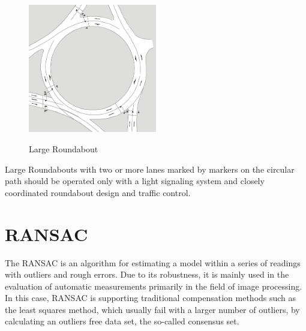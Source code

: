 \begin{figure}[!ht]
\caption{Large Roundabout \cite{man06}}
\includegraphics[width=0.5\textwidth]{bilder/large_roundabout.png} %
\label{roundabout_large}
\end{figure}

Large Roundabouts with two or more lanes marked by markers on the circular path should be operated only with a light signaling system and closely coordinated roundabout design and traffic control.\cite{man06}


\section{\acl{RANSAC}}

The \ac{RANSAC} \cite{Fischler1981} is an algorithm for estimating a model within a series of readings with outliers and rough errors. Due to its robustness, 
it is mainly used in the evaluation of automatic measurements primarily in the field of image processing. 
In this case, \ac{RANSAC} is supporting traditional compensation methods such as the least squares method, which usually fail with a larger number of outliers,
by calculating an outliers free data set, the so-called consensus set. 

